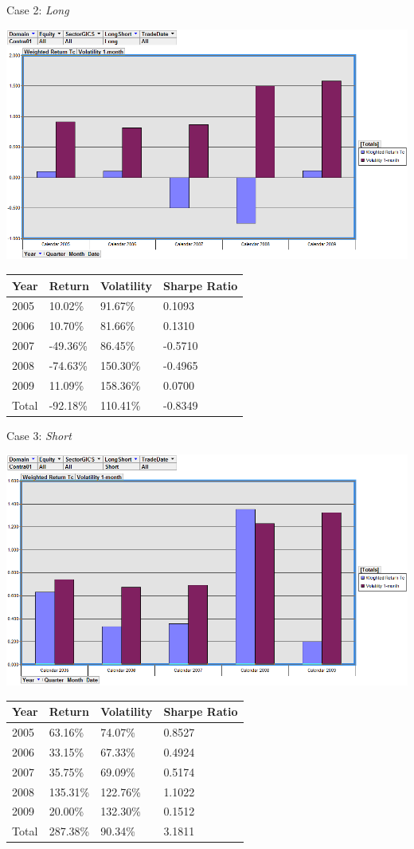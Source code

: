 \documentclass[11pt,letter]{article}
\begin{document}
Case 2: \textit{Long}
\begin{center}
\includegraphics[scale=0.5,keepaspectratio]{2a_long}
\newline

\begin{tabular}{l|lll}
Year & Return & Volatility & Sharpe Ratio\\
\hline
2005	&10.02\%	&91.67\%	&0.1093\\
2006	&10.70\%	&81.66\%	&0.1310\\
2007	&-49.36\%	&86.45\%	&-0.5710\\
2008	&-74.63\%	&150.30\%	&-0.4965\\
2009	&11.09\%	&158.36\%	&0.0700\\
\hline
Total&	-92.18\%	&110.41\%	&-0.8349
\end{tabular}
\end{center}


Case 3: \textit{Short}
\begin{center}
\includegraphics[scale=0.5,keepaspectratio]{2a_short}
\newline

\begin{tabular}{l|lll}
Year & Return & Volatility & Sharpe Ratio\\
\hline
2005	&63.16\%	&74.07\%	&0.8527\\
2006	&33.15\%	&67.33\%	&0.4924\\
2007	&35.75\%	&69.09\%	&0.5174\\
2008	&135.31\%	&122.76\%	&1.1022\\
2009	&20.00\%	&132.30\%	&0.1512\\
Total&	287.38\%	&90.34\%	&3.1811
\end{tabular}
\end{center}
\end{document}

